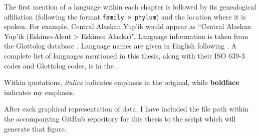 The first mention of a language within each chapter is followed by its genealogical affiliation (following the format \texttt{family > phylum}) and the location where it is spoken. For example, Central Alaskan Yup'ik would appear as \enquote{Central Alaskan Yup'ik (Eskimo-Aleut > Eskimo; Alaska)}. Language information is taken from the Glottolog database \citep{HammarstromForkelHaspelmath2019}. Language names are given in English following \citet{Haspelmath2017}. A complete list of languages mentioned in this thesis, along with their ISO 639-3 codes and Glottolog codes, is in the .

Within quotations, \textit{italics} indicates emphasis in the original, while \textbf{boldface} indicates my emphasis.


After each graphical representation of data, I have included the file path within the accompanying GitHub repository for this thesis to the script which will generate that figure.
